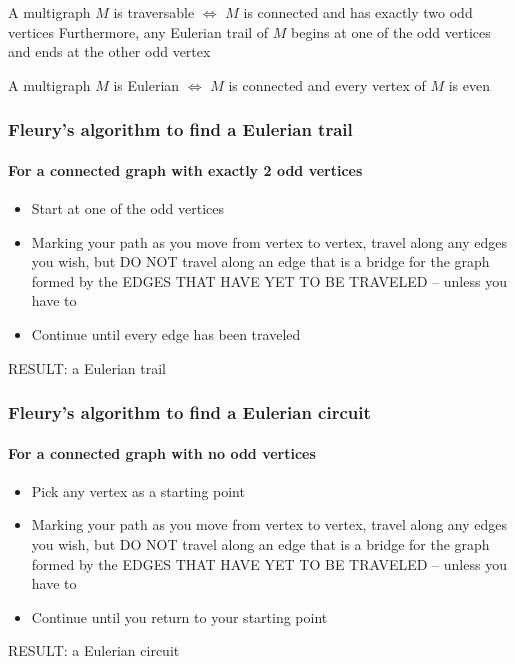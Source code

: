 \documentclass[aspectratio=43]{beamer}
\begin{document}
\begin{frame}
\begin{theorem}
	A multigraph $M$ is traversable $\iff$ $M$ is connected and has exactly two odd vertices
	\vskip0.2cm
	Furthermore, any Eulerian trail of $M$ begins at one of the odd vertices and ends at the other odd vertex
\end{theorem}
\vfill
\begin{theorem}
	A multigraph $M$ is Eulerian $\iff$ $M$ is connected and every vertex of $M$ is even
\end{theorem}
\end{frame}




\begin{frame}
	\frametitle{Fleury's algorithm to find a Eulerian trail}
	\framesubtitle{For a connected graph with exactly 2 odd vertices}
\begin{itemize}
	\item Start at one of the odd vertices
	\item Marking your path as you move from vertex to vertex, travel along any edges you wish, but DO NOT travel along an edge that is a bridge for the graph formed by the EDGES THAT HAVE YET TO BE TRAVELED -- unless you have to
	\item Continue until every edge has been traveled
\end{itemize}
RESULT: a Eulerian trail
\end{frame}


\begin{frame}
	\frametitle{Fleury's algorithm to find a Eulerian circuit}
	\framesubtitle{For a connected graph with no odd vertices}

	\begin{itemize}
	\item Pick any vertex as a starting point
	\item Marking your path as you move from vertex to vertex, travel along any edges you wish, but DO NOT travel along an edge that is a bridge for the graph formed by the EDGES THAT HAVE YET TO BE TRAVELED -- unless you have to
	\item Continue until you return to your starting point
\end{itemize}
RESULT: a Eulerian circuit
\end{frame}
\end{document}
